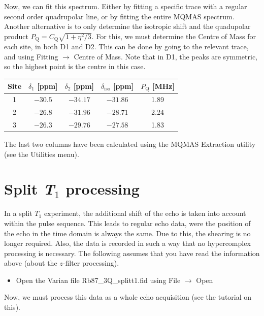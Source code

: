 \documentclass[11pt,a4paper]{article}
\begin{document}
Now, we can fit this spectrum.
Either by fitting a specific trace with a regular second order quadrupolar line, or by fitting the entire MQMAS spectrum.
Another alternative is to only determine the isotropic shift and the quadupolar product $P_\text{Q} = C_\text{Q}\sqrt{1+\eta^2/3}$.
For this, we must determine the Centre of Mass for each site, in both D1 and D2.
This can be done by going to the relevant trace, and using Fitting  $\longrightarrow$ Centre of Mass.
Note that in D1, the peaks are symmetric, so the highest point is the centre in this case.

\begin{center}
  \begin{tabular}{c|cc| c c}
	 \toprule
	 Site & $\delta_1$ [ppm]& $\delta_2$ [ppm]& $\delta_\text{iso}$ [ppm]& $P_\text{Q}$ [MHz]  \\
	 \midrule
	 1 & $-30.5$ & $-34.17$ & $-31.86$ & 1.89 \\
	 2& $-26.8$ &$-31.96$  &$-28.71$ & 2.24\\
	 3& $-26.3$ &$-29.76$ & $-27.58$ & 1.83 \\
	\bottomrule
  \end{tabular}
\end{center}
The last two columns have been calculated using the MQMAS Extraction utility (see the Utilities menu). 


\section{Split \textit{T}$_\text{1}$ processing}
In a split $T_\text{1}$ experiment, the additional shift of the echo is taken into account within the pulse sequence.
This leads to regular echo data, were the position of the echo in the time domain is always the same.
Due to this, the shearing is no longer required.
Also, the data is recorded in such a way that no hypercomplex processing is necessary.
The following assumes that you have read the information above (about the $z$-filter processing).

\begin{itemize}
	\item Open the Varian file Rb87\_3Q\_splitt1.fid using File $\longrightarrow$ Open
\end{itemize}
Now, we must process this data as a whole echo acquisition (see the tutorial on this).
\end{document}
